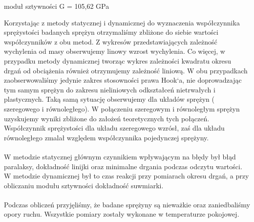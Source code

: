 \documentclass{article}
\begin{document}
\begin{center}
	moduł sztywności G = 105,62 GPa
\end{center}

Korzystając z metody statycznej i dynamicznej do wyznaczenia współczynnika sprężystości badanych sprężyn otrzymaliśmy zbliżone do siebie wartości współczynników z obu metod. Z wykresów przedstawiających zależność wychylenia od masy obserwujemy linowy wzrost wychylenia. Co więcej, w przypadku metody dynamicznej tworząc wykres zależności kwadratu okresu drgań od obciążenia również otrzymujemy zależność liniową. W obu przypadkach zaobserwowaliśmy jedynie zakres stosowności prawa Hook`a, nie doprowadzając tym samym sprężyn do zakresu nieliniowych odkształceń nietrwałych i plastycznych. Taką samą sytuację obserwujemy dla układów sprężyn ( szeregowego i równoległego).
W połączeniu szeregowym i równoległym sprężyn uzyskujemy wyniki zbliżone do założeń teoretycznych tych połączeń. Współczynnik sprężystości dla układu szeregowego wzrósł, zaś dla układu równoległego zmalał względem współczynnika pojedynczej  sprężyny.\\ \\
W metodzie statycznej głównym czynnikiem wpływającym na błędy był błąd paralaksy, dokładność linijki oraz minimalne drgania podczas odczytu wartości. W metodzie dynamicznej był to czas reakcji przy pomiarach okresu drgań, a przy obliczaniu modułu sztywności dokładność suwmiarki.\\ \\
Podczas obliczeń przyjęliśmy, że badane sprężyny są nieważkie oraz zaniedbaliśmy opory ruchu.
Wszystkie pomiary zostały wykonane w temperaturze pokojowej.
\end{document}

